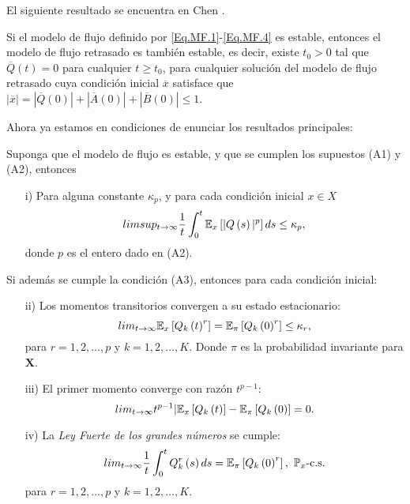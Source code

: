 El siguiente resultado se encuentra en Chen \cite{Chen}.
\begin{Lemma}
Si el modelo de flujo definido por \ref{Eq.MF.1}-\ref{Eq.MF.4} es
estable, entonces el modelo de flujo retrasado es tambi\'en
estable, es decir, existe $t_{0}>0$ tal que
$\overline{Q}\left(t\right)=0$ para cualquier $t\geq t_{0}$, para
cualquier soluci\'on del modelo de flujo retrasado cuya
condici\'on inicial $\overline{x}$ satisface que
$|\overline{x}|=|\overline{Q}\left(0\right)|+|\overline{A}\left(0\right)|+|\overline{B}\left(0\right)|\leq1$.
\end{Lemma}


Ahora ya estamos en condiciones de enunciar los resultados principales:


\begin{Teo}\label{Tma2.1.Down}
Suponga que el modelo de flujo es estable, y que se cumplen los supuestos (A1) y (A2), entonces
\begin{itemize}
\item[i)] Para alguna constante $\kappa_{p}$, y para cada
condici\'on inicial $x\in X$
\begin{equation}\label{Estability.Eq1}
limsup_{t\rightarrow\infty}\frac{1}{t}\int_{0}^{t}\mathbb{E}_{x}\left[|Q\left(s\right)|^{p}\right]ds\leq\kappa_{p},
\end{equation}
donde $p$ es el entero dado en (A2).
\end{itemize}
Si adem\'as se cumple la condici\'on (A3), entonces para cada
condici\'on inicial:
\begin{itemize}
\item[ii)] Los momentos transitorios convergen a su estado
estacionario:
 \begin{equation}\label{Estability.Eq2}
lim_{t\rightarrow\infty}\mathbb{E}_{x}\left[Q_{k}\left(t\right)^{r}\right]=\mathbb{E}_{\pi}\left[Q_{k}\left(0\right)^{r}\right]\leq\kappa_{r},
\end{equation}
para $r=1,2,\ldots,p$ y $k=1,2,\ldots,K$. Donde $\pi$ es la
probabilidad invariante para $\mathbf{X}$.

\item[iii)]  El primer momento converge con raz\'on $t^{p-1}$:
\begin{equation}\label{Estability.Eq3}
lim_{t\rightarrow\infty}t^{p-1}|\mathbb{E}_{x}\left[Q_{k}\left(t\right)\right]-\mathbb{E}_{\pi}\left[Q_{k}\left(0\right)\right]=0.
\end{equation}

\item[iv)] La {\em Ley Fuerte de los grandes n\'umeros} se cumple:
\begin{equation}\label{Estability.Eq4}
lim_{t\rightarrow\infty}\frac{1}{t}\int_{0}^{t}Q_{k}^{r}\left(s\right)ds=\mathbb{E}_{\pi}\left[Q_{k}\left(0\right)^{r}\right],\textrm{
}\mathbb{P}_{x}\textrm{-c.s.}
\end{equation}
para $r=1,2,\ldots,p$ y $k=1,2,\ldots,K$.
\end{itemize}
\end{Teo}

